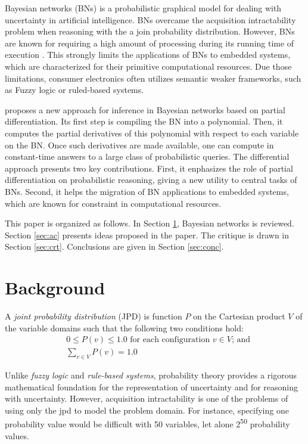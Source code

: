 \documentclass[twoside,11pt]{article}
\begin{document}
Bayesian networks (BNs) \citep{pear88} is a probabilistic graphical model for dealing with uncertainty in artificial intelligence.
BNs overcame the acquisition intractability problem when reasoning with the a join probability distribution.
However, BNs are known for requiring a high amount of processing during its running time of execution \citep{koll09}.
This strongly limits the applications of BNs to embedded systems, which are characterized for their primitive computational resources. 
Due those limitations, consumer electronics often utilizes semantic weaker frameworks, such as Fuzzy logic or ruled-based systems.


\cite{darwiche00} proposes a new approach for inference in Bayesian networks based on partial differentiation.
Its first step is compiling the BN into a polynomial.
Then, it computes the partial derivatives of this polynomial with respect to each variable on the BN.
Once such derivatives are made available, one can compute in constant-time answers to a large class of probabilistic queries.
The differential approach presents two key contributions.
First, it enphasizes the role of partial differentiation on probabilistic reasoning, giving a new utility to central tasks of BNs.
Second, it helps the migration of BN applications to embedded systems, which are known for constraint in computational resources.

This paper is organized as follows.
In Section \ref{sec:background}, Bayesian networks is reviewed.
Section \ref{sec:ac} presents ideas proposed in the paper.
The critique is drawn in Section \ref{sec:crt}.
Conclusions are given in Section \ref{sec:conc}.


\section{Background}
\label{sec:background}

A \emph{joint probability distribution} (JPD) is function $P$ on the Cartesian product $V$ of the variable domains such that the following two conditions hold: 
\begin{align}
	&0 \leq P(v) \leq 1.0\text{ for each configuration $v \in V$; and}\\		
	&\sum_{v \in V}{P(v)} = 1.0
\end{align}

Unlike \emph{fuzzy logic} and \emph{rule-based systems}, probability theory provides a rigorous mathematical foundation for the representation of uncertainty and for reasoning with uncertainty.
However, acquisition intractability is one of the problems of using only the jpd to model the problem domain.
For instance, specifying one probability value would be difficult with 50 variables, let alone 2\textsuperscript{50} probability values.
\end{document}
